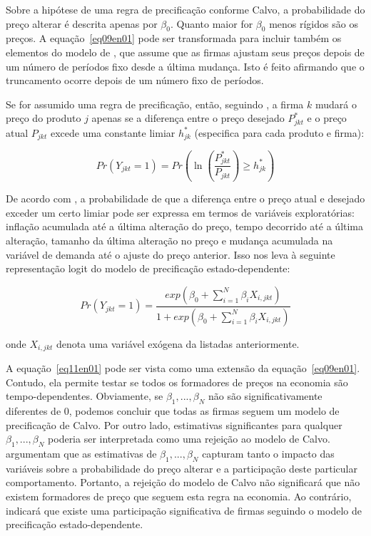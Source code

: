\begin{algorithm}[H]
Sobre a hipótese de uma regra de precificação conforme Calvo, a probabilidade do preço alterar é descrita apenas por ${ \beta  }_{ 0 }$. Quanto maior for ${ \beta  }_{ 0 }$ menos rígidos são os preços. A equação~\ref{eq09en01} pode ser transformada para incluir também os elementos do modelo de \citet{taylor1980aggregate}, que assume que as firmas ajustam seus preços depois de um número de períodos fixo desde a última mudança. Isto é feito afirmando que o truncamento ocorre depois de um número fixo de períodos.

Se for assumido uma regra de precificação, então, seguindo \citet{cecchetti1986frequency}, a firma $k$ mudará o preço do produto $j$ apenas se a diferença entre o preço desejado $P_{jkt}^{*}$ e o preço atual $P_{jkt}$ excede uma constante limiar $h_{jk}^{*}$ (especifica para cada produto e firma):

\begin{equation}\label{eq10en01}
Pr\left( { Y }_{ jkt }=1 \right) =Pr\left( \ln { \left( \frac { { P }_{ jkt }^{ * } }{ { P }_{ jkt } }  \right) \ge { h }_{ jk }^{ * } }  \right) 
\end{equation}

De acordo com \citet{cecchetti1986frequency}, a probabilidade de que a diferença entre o preço atual e desejado exceder um certo limiar pode ser expressa em termos de variáveis exploratórias: inflação acumulada até a última alteração do preço, tempo decorrido até a última alteração, tamanho da última alteração no preço e mudança acumulada na variável de demanda até o ajuste do preço anterior. Isso nos leva à seguinte representação logit do modelo de precificação estado-dependente:

\begin{equation}\label{eq11en01}
Pr\left( { Y }_{ jkt }=1 \right) =\frac { exp\left( { \beta  }_{ 0 }+\sum _{ i=1 }^{ N }{ { \beta  }_{ i }{ X }_{ i,jkt } }  \right)  }{ 1+exp\left( { \beta  }_{ 0 }+\sum _{ i=1 }^{ N }{ { \beta  }_{ i }{ X }_{ i,jkt } }  \right)  } 
\end{equation}

\noindent onde ${ X }_{ i,jkt }$ denota uma variável exógena da listadas anteriormente.

A equação~\ref{eq11en01} pode ser vista como uma extensão da equação~\ref{eq09en01}. Contudo, ela permite testar se todos os formadores de preços na economia são tempo-dependentes. Obviamente, se $\beta_{1},...,\beta_{N}$ não são significativamente diferentes de 0, podemos concluir que todas as firmas seguem um modelo de precificação de Calvo. Por outro lado, estimativas significantes para qualquer $\beta_{1},...,\beta_{N}$ poderia ser interpretada como uma rejeição ao modelo de Calvo. \citet{aucremanne2005time} argumentam que as estimativas de $\beta_{1},...,\beta_{N}$ capturam tanto o impacto das variáveis sobre a probabilidade do preço alterar e a participação deste particular comportamento. Portanto, a rejeição do modelo de Calvo não significará que não existem formadores de preço que seguem esta regra na economia. Ao contrário, indicará que existe uma participação significativa de firmas seguindo o modelo de precificação estado-dependente.


\end{algorithm}
